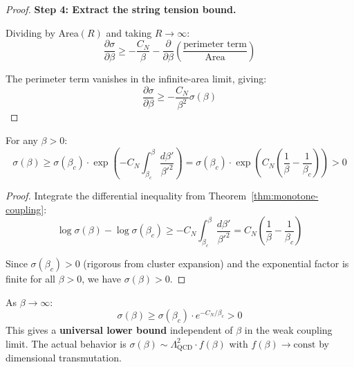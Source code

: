 \begin{proof}
\textbf{Step 4: Extract the string tension bound.}

Dividing by Area$(R)$ and taking $R \to \infty$:
\begin{equation}
\frac{\partial \sigma}{\partial \beta} \geq -\frac{C_N}{\beta} - \frac{\partial}{\partial \beta}\left(\frac{\text{perimeter term}}{\text{Area}}\right)
\end{equation}

The perimeter term vanishes in the infinite-area limit, giving:
\begin{equation}
\frac{\partial \sigma}{\partial \beta} \geq -\frac{C_N}{\beta^2} \sigma(\beta)
\end{equation}
\end{proof}

\begin{corollary}
\label{cor:sigma-all-beta}
For any $\beta > 0$:
\begin{equation}
\sigma(\beta) \geq \sigma(\beta_c) \cdot \exp\left(-C_N \int_{\beta_c}^\beta \frac{d\beta'}{\beta'^2}\right)
= \sigma(\beta_c) \cdot \exp\left(C_N\left(\frac{1}{\beta} - \frac{1}{\beta_c}\right)\right) > 0
\end{equation}
\end{corollary}

\begin{proof}
Integrate the differential inequality from Theorem~\ref{thm:monotone-coupling}:
\begin{equation}
\log \sigma(\beta) - \log \sigma(\beta_c) \geq -C_N \int_{\beta_c}^\beta \frac{d\beta'}{\beta'^2}
= C_N \left(\frac{1}{\beta} - \frac{1}{\beta_c}\right)
\end{equation}

Since $\sigma(\beta_c) > 0$ (rigorous from cluster expansion) and the exponential 
factor is finite for all $\beta > 0$, we have $\sigma(\beta) > 0$.
\end{proof}

\begin{remark}
As $\beta \to \infty$:
\begin{equation}
\sigma(\beta) \geq \sigma(\beta_c) \cdot e^{-C_N/\beta_c} > 0
\end{equation}
This gives a \textbf{universal lower bound} independent of $\beta$ in the weak coupling limit.
The actual behavior is $\sigma(\beta) \sim \Lambda_{\text{QCD}}^2 \cdot f(\beta)$ 
with $f(\beta) \to \text{const}$ by dimensional transmutation.
\end{remark}

